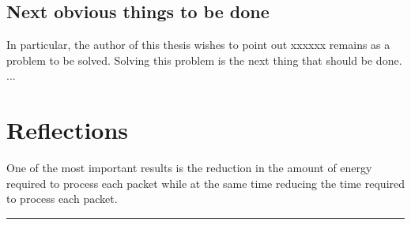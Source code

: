 \subsection{Next obvious things to be done}


In particular, the author of this thesis wishes to point out xxxxxx remains as a problem to be solved. Solving this problem is the next thing that should be done. ...


\section{Reflections}
\label{sec:reflections}






One of the most important results is the reduction in the amount of
energy required to process each packet while at the same time reducing the
time required to process each packet.




\noindent\rule{\textwidth}{0.4mm}




\cleardoublepage
